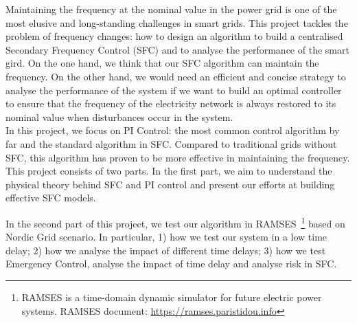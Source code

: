 
Maintaining the frequency at the nominal value in the power grid is one of the most elusive and long-standing challenges in smart grids. This project tackles the problem of frequency changes: how to design an algorithm to build a centralised Secondary Frequency Control (SFC) and to analyse the performance of the smart gird. On the one hand, we think that our SFC algorithm can maintain the frequency. On the other hand, we would need an efficient and concise strategy to analyse the performance of the system if we want to build an optimal controller to ensure that the frequency of the electricity network is always restored to its nominal value when disturbances occur in the system.\\

In this project, we focus on PI Control: the most common control algorithm by far and the standard algorithm in SFC. Compared to traditional grids without SFC, this algorithm has proven to be more effective in maintaining the frequency.\\

This project consists of two parts. In the first part, we aim to understand the physical theory behind SFC and PI control and present our efforts at building effective SFC models. 

In the second part of this project, we test our algorithm in RAMSES~\footnote{RAMSES is a time-domain dynamic simulator for future electric power systems. RAMSES document: \href{https://ramses.paristidou.info}{https://ramses.paristidou.info}} based on Nordic Grid scenario. In particular, 1) how we test our system in a low time delay; 2) how we analyse the impact of different time delays; 3) how we test Emergency Control, analyse the impact of time delay and analyse risk in SFC. 